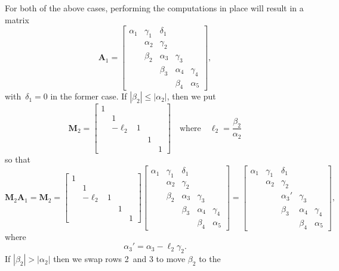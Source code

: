 For both of the above cases, performing the computations in place will result 
in a matrix 
\[
\boldsymbol{A}_1=
\begin{bmatrix}
\alpha_1&\gamma_1&\delta_1&        &\\
        &\alpha_2&\gamma_2&        &\\
        & \beta_2&\alpha_3&\gamma_3&\\
        &        & \beta_3&\alpha_4&\gamma_4\\
        &        &        & \beta_4&\alpha_5
\end{bmatrix},
\]
with~$\delta_1=0$ in the former case.  If $|\beta_2|\le|\alpha_2|$, then we put
\[
\boldsymbol{M}_2=\begin{bmatrix}
1&       & & &\\
 &      1& & &\\
 &-\ell_2&1& &\\
 &       & &1&\\
 &       & & &1
\end{bmatrix}\quad\text{where}\quad\ell_2=\frac{\beta_2}{\alpha_2}
\]
so that
\[
\boldsymbol{M}_2\boldsymbol{A}_1=
\boldsymbol{M}_2=\begin{bmatrix}
1&       & & &\\
 &      1& & &\\
 &-\ell_2&1& &\\
 &       & &1&\\
 &       & & &1
\end{bmatrix}
\begin{bmatrix}
\alpha_1&\gamma_1&\delta_1&        &\\
        &\alpha_2&\gamma_2&        &\\
        & \beta_2&\alpha_3&\gamma_3&\\
        &        & \beta_3&\alpha_4&\gamma_4\\
        &        &        & \beta_4&\alpha_5
\end{bmatrix}=
\begin{bmatrix}
\alpha_1&\gamma_1& \delta_1&        &\\
        &\alpha_2& \gamma_2&        &\\
        &        &\alpha_3'&\gamma_3&\\
        &        &  \beta_3&\alpha_4&\gamma_4\\
        &        &         & \beta_4&\alpha_5
\end{bmatrix},
\]
where
\[
\alpha_3'=\alpha_3-\ell_2\gamma_2.
\]
If $|\beta_2|>|\alpha_2|$ then we swap rows 2~and 3 to move $\beta_2$ to the 
